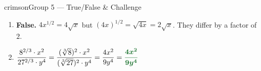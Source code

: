 \documentclass[12pt]{article}
\begin{document}
\vspace{8pt}

\begin{pracbox}{crimson}{Group 5 --- True/False \& Challenge}
\begin{enumerate}[label=\textbf{\arabic*.}, itemsep=8pt, start=20]
  \item {\color{ansgreen}\bfseries False.}\;
        $4x^{1/2}=4\sqrt{x}$ \quad but \quad
        $(4x)^{1/2}=\sqrt{4x}=2\sqrt{x}$.\;
        They differ by a factor of $2$.
  \item $\dfrac{8^{2/3}\cdot x^2}{27^{2/3}\cdot y^4}
        = \dfrac{(\sqrt[3]{8})^2\cdot x^2}{(\sqrt[3]{27})^2\cdot y^4}
        = \dfrac{4x^2}{9y^4}
        = {\color{ansgreen}\boldsymbol{\dfrac{4x^2}{9y^4}}}$
\end{enumerate}
\end{pracbox}
\end{document}
